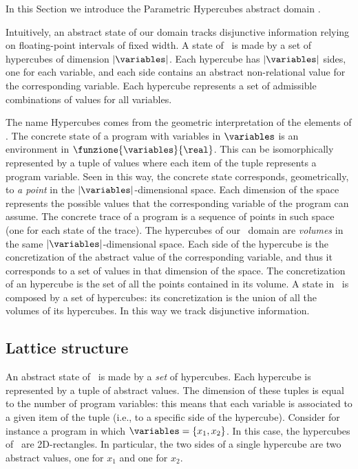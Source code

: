 In this Section we introduce the Parametric Hypercubes abstract domain \adomain.

Intuitively, an abstract state of our domain tracks disjunctive information relying on floating-point intervals of fixed width. A state of \adomain\ is made by a set of hypercubes of dimension $|\variables|$. Each hypercube has $|\variables|$ sides, one for each variable, and each side contains an abstract non-relational value for the corresponding variable. Each hypercube represents a set of admissible combinations of values for all variables. 

The name Hypercubes comes from the geometric interpretation of the elements of \adomain . The concrete state of a program with variables in $\variables$ is an environment in $\funzione{\variables}{\real}$. This can be isomorphically represented by a tuple of values where each item of the tuple represents a program variable. Seen in this way, the concrete state corresponds, geometrically, to \emph{a point} in the $|\variables|$-dimensional space. Each dimension of the space represents the possible values that the corresponding variable of the program can assume. The concrete trace of a program is a sequence of points in such space (one for each state of the trace). The hypercubes of our \adomain\ domain are \emph{volumes} in the same $|\variables|$-dimensional space. Each side of the hypercube is the concretization of the abstract value of the corresponding variable, and thus it corresponds to a set of values in that dimension of the space. The concretization of an hypercube is the set of all the points contained in its volume. A state in \adomain\ is composed by a set of hypercubes: its concretization is the union of all the volumes of its hypercubes.  In this way we track disjunctive information.


\subsection{Lattice structure}
An abstract state of \adomain\ is made by a \emph{set} of hypercubes. Each hypercube is represented by a tuple of abstract values. The dimension of these tuples is equal to the number of program variables: this means that each variable is associated to a given item of the tuple (i.e., to a specific side of the hypercube). 
Consider for instance a program in which $\variables = \{x_1, x_2\}$. In this case, the hypercubes of \adomain\ are 2D-rectangles. In particular, the two sides of a single hypercube are two abstract values, one for $x_1$ and one for $x_2$.

